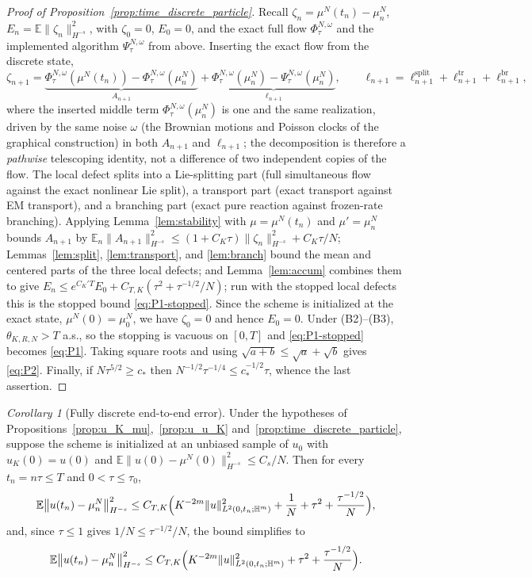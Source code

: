 \documentclass[a4paper,fleqn]{cas-sc}
\theoremstyle{definition}
\theoremstyle{remark}
\newtheorem{corollary}{Corollary}
\begin{document}
\begin{proof}[Proof of Proposition~\ref{prop:time_discrete_particle}]
Recall $\zeta_n=\mu^N(t_n)-\mu^N_n$, $E_n=\mathbb E\|\zeta_n\|_{H^{-s}}^2$, with
$\zeta_0=0$, $E_0=0$, and the exact full flow $\Phi^{N,\omega}_\tau$ and the
implemented algorithm $\Psi^{N,\omega}_\tau$ from above. Inserting the exact flow
from the discrete state,
\[
\zeta_{n+1}
=\underbrace{\Phi^{N,\omega}_\tau(\mu^N(t_n))-\Phi^{N,\omega}_\tau(\mu^N_n)}_{A_{n+1}}
+\underbrace{\Phi^{N,\omega}_\tau(\mu^N_n)-\Psi^{N,\omega}_\tau(\mu^N_n)}_{\ell_{n+1}},
\qquad
\ell_{n+1}=\ell^{\mathrm{split}}_{n+1}+\ell^{\mathrm{tr}}_{n+1}+\ell^{\mathrm{br}}_{n+1},
\]
where the inserted middle term $\Phi^{N,\omega}_\tau(\mu^N_n)$ is one and the same
realization, driven by the same noise $\omega$ (the Brownian motions and Poisson
clocks of the graphical construction) in both $A_{n+1}$ and $\ell_{n+1}$; the
decomposition is therefore a \emph{pathwise} telescoping identity, not a difference
of two independent copies of the flow. The local defect splits into a Lie-splitting
part (full simultaneous flow against the exact nonlinear Lie split), a transport
part (exact transport against EM transport), and a branching part (exact pure
reaction against frozen-rate branching). Applying Lemma~\ref{lem:stability} with $\mu=\mu^N(t_n)$ and
$\mu'=\mu^N_n$ bounds $A_{n+1}$ by
$\mathbb E_n\|A_{n+1}\|_{H^{-s}}^2\le(1+C_K\tau)\|\zeta_n\|_{H^{-s}}^2+C_K\tau/N$;
Lemmas~\ref{lem:split}, \ref{lem:transport}, and \ref{lem:branch} bound the mean
and centered parts of the three local defects; and Lemma~\ref{lem:accum} combines
them to give $E_n\le e^{C_K'T}E_0+C_{T,K}(\tau^2+\tau^{-1/2}/N)$; run with the stopped
local defects this is the stopped bound \eqref{eq:P1-stopped}. Since the scheme is
initialized at the exact state, $\mu^N(0)=\mu^N_0$, we have $\zeta_0=0$ and hence
$E_0=0$. Under (B2)--(B3), $\theta_{K,R,N}>T$ a.s., so the stopping is vacuous on
$[0,T]$ and \eqref{eq:P1-stopped} becomes \eqref{eq:P1}. Taking square roots and using
$\sqrt{a+b}\le\sqrt a+\sqrt b$ gives \eqref{eq:P2}. Finally, if $N\tau^{5/2}\ge c_*$
then $N^{-1/2}\tau^{-1/4}\le c_*^{-1/2}\tau$, whence the last assertion.
\end{proof}

\begin{corollary}[Fully discrete end-to-end error]\label{cor:end-to-end}
Under the hypotheses of Propositions~\ref{prop:u_K_mu},~\ref{prop:u_u_K}
and~\ref{prop:time_discrete_particle}, suppose the scheme is initialized at an
unbiased sample of $u_0$ with $u_K(0)=u(0)$ and
$\mathbb E\|u(0)-\mu^N(0)\|_{H^{-s}}^2\le C_s/N$. Then for every $t_n=n\tau\le T$ and
$0<\tau\le\tau_0$,
\begin{equation}\label{eq:end-to-end}
\mathbb E\bigl\|u(t_n)-\mu^N_n\bigr\|_{H^{-s}}^2
\le C_{T,K}\Bigl(K^{-2m}\|u\|_{L^2(0,t_n;\mathbb H^m)}^2+\frac1N+\tau^2+\frac{\tau^{-1/2}}{N}\Bigr),
\end{equation}
and, since $\tau\le1$ gives $1/N\le\tau^{-1/2}/N$, the bound simplifies to
\[
\mathbb E\bigl\|u(t_n)-\mu^N_n\bigr\|_{H^{-s}}^2
\le C_{T,K}\Bigl(K^{-2m}\|u\|_{L^2(0,t_n;\mathbb H^m)}^2+\tau^2+\frac{\tau^{-1/2}}{N}\Bigr).
\]
\end{corollary}
\end{document}
